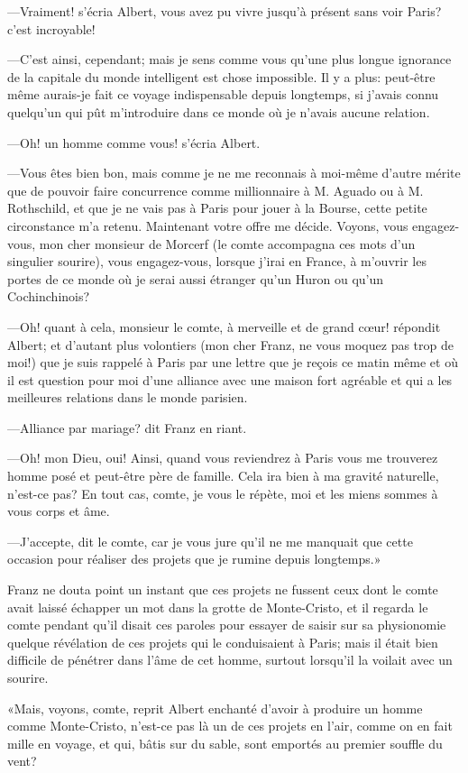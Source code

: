 —Vraiment! s'écria Albert, vous avez pu vivre jusqu'à présent sans voir Paris? c'est incroyable! 

—C'est ainsi, cependant; mais je sens comme vous qu'une plus longue ignorance de la capitale du monde intelligent est chose impossible. Il y a plus: peut-être même aurais-je fait ce voyage indispensable depuis longtemps, si j'avais connu quelqu'un qui pût m'introduire dans ce monde où je n'avais aucune relation.  

—Oh! un homme comme vous! s'écria Albert. 

—Vous êtes bien bon, mais comme je ne me reconnais à moi-même d'autre mérite que de pouvoir faire concurrence comme millionnaire à M. Aguado ou à M. Rothschild, et que je ne vais pas à Paris pour jouer à la Bourse, cette petite circonstance m'a retenu. Maintenant votre offre me décide. Voyons, vous engagez-vous, mon cher monsieur de Morcerf (le comte accompagna ces mots d'un singulier sourire), vous engagez-vous, lorsque j'irai en France, à m'ouvrir les portes de ce monde où je serai aussi étranger qu'un Huron ou qu'un Cochinchinois? 

—Oh! quant à cela, monsieur le comte, à merveille et de grand cœur! répondit Albert; et d'autant plus volontiers (mon cher Franz, ne vous moquez pas trop de moi!) que je suis rappelé à Paris par une lettre que je reçois ce matin même et où il est question pour moi d'une alliance avec une maison fort agréable et qui a les meilleures relations dans le monde parisien. 

—Alliance par mariage? dit Franz en riant. 

—Oh! mon Dieu, oui! Ainsi, quand vous reviendrez à Paris vous me trouverez homme posé et peut-être père de famille. Cela ira bien à ma gravité naturelle, n'est-ce pas? En tout cas, comte, je vous le répète, moi et les miens sommes à vous corps et âme. 

—J'accepte, dit le comte, car je vous jure qu'il ne me manquait que cette occasion pour réaliser des projets que je rumine depuis longtemps.» 

Franz ne douta point un instant que ces projets ne fussent ceux dont le comte avait laissé échapper un mot dans la grotte de Monte-Cristo, et il regarda le comte pendant qu'il disait ces paroles pour essayer de saisir sur sa physionomie quelque révélation de ces projets qui le conduisaient à Paris; mais il était bien difficile de pénétrer dans l'âme de cet homme, surtout lorsqu'il la voilait avec un sourire. 

«Mais, voyons, comte, reprit Albert enchanté d'avoir à produire un homme comme Monte-Cristo, n'est-ce pas là un de ces projets en l'air, comme on en fait mille en voyage, et qui, bâtis sur du sable, sont emportés au premier souffle du vent?  

